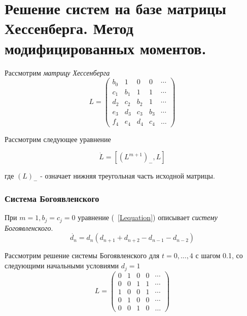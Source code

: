 \documentclass{report}
\begin{document}
\chapter {Решение систем на базе матрицы Хессенберга. Метод модифицированных моментов.}
Рассмотрим \emph {матрицу Хессенберга}
\begin{equation}
\label{Hessenberg}
L=
\left(\begin{array}{cccccccccccc}
b_0 & 1 & 0 & 0 &  \cdots \\
c_1 & b_1 & 1 & 1 &  \cdots \\
d_2 & c_2 & b_2 & 1 &  \cdots \\
e_3 & d_3 & c_3 & b_3 &  \cdots \\
f_4 & e_4 & d_4 & c_4 & \ldots
\end{array}\right)
\end{equation}

Рассмотрим следующее уравнение

\begin{equation}
\label{Lequation}
\dot{L}=[(L^{m+1})_{-},L]
\end{equation}

где $(L)_{-}$ - означает нижняя треугольная часть исходной матрицы. \\


\subsection {Система Богоявленского}
При $m=1, b_j = c_j = 0$ уравнение (~\ref{Lequation}) описывает \emph {систему Богоявленского}.
$$
\dot{d_n}=d_n(d_{n+1}+d_{n+2}-d_{n-1}-d_{n-2})
$$

Рассмотрим решение системы Богоявленского для $t=0, ...,4$  с шагом 0.1, со следующими начальными условиями $d_j = 1$ \\
$$
L=
\left(\begin{array}{cccccccccccc}
0 & 1 & 0 & 0 &  \cdots \\
0 & 0 & 1 & 1 &  \cdots \\
1 & 0 & 0 & 1 &  \cdots \\
0 & 1 & 0 & 0 &  \cdots \\
0 & 0 & 1 & 0 & \ldots
\end{array}\right)
$$
\end{document}
